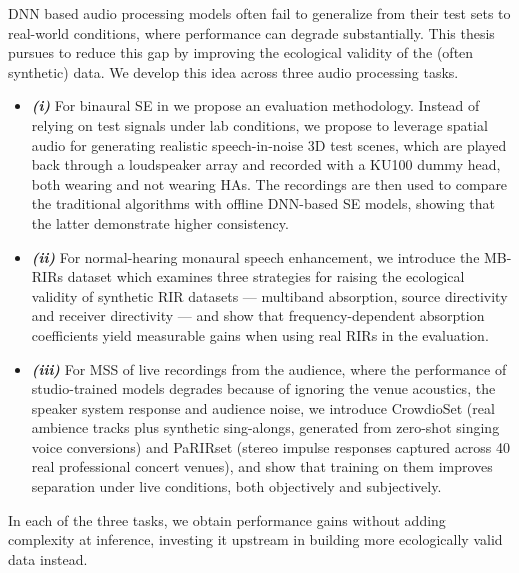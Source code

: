 \acrfull{DNN} based audio processing models often fail to generalize from their test sets to real-world conditions, where performance can degrade substantially. This thesis pursues to reduce this gap by improving the ecological validity of the (often synthetic) data.
We develop this idea across three audio processing tasks. 

\begin{itemize}


\item \textbf{\textit{(i)}} For binaural \acrfull{SE} in  we propose an evaluation methodology. Instead of relying on test signals under lab conditions, we propose to leverage spatial audio for generating realistic speech-in-noise  3D test scenes, which are played back through a loudspeaker array and recorded with a KU100 dummy head, both wearing and not wearing HAs. The recordings are then used to compare the traditional  algorithms with offline DNN-based SE models, showing that the latter demonstrate higher consistency.

\item \textbf{\textit{(ii)}} For normal-hearing monaural speech enhancement, we introduce the MB-RIRs dataset which examines three strategies for raising the ecological validity of synthetic \acrfull{RIR} datasets — multiband absorption, source directivity and receiver directivity — and show that frequency-dependent absorption coefficients yield measurable gains when using real RIRs in the evaluation. 

\item \textbf{\textit{(iii)}} For \acrfull{MSS} of live recordings from the audience, where the performance of studio-trained models degrades because of ignoring the venue acoustics, the speaker system response and audience noise, we introduce CrowdioSet (real ambience tracks plus synthetic sing-alongs, generated from zero-shot singing voice conversions) and PaRIRset (stereo impulse responses captured across 40 real professional concert venues), and show that training on them improves separation under live conditions, both objectively and subjectively.

\end{itemize}
In each of the three tasks, we obtain performance gains without adding complexity at inference, investing it upstream in building more ecologically valid data instead.

